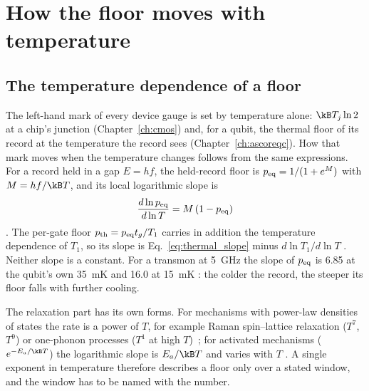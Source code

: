 \chapter{How the floor moves with temperature}\label{ch:thermaln}

\section{The temperature dependence of a floor}\label{sec:floorT}

The left-hand mark of every device gauge is set by temperature alone: $\kB T_j\ln2$ at a chip's junction (Chapter~\ref{ch:cmos}) and, for a
qubit, the thermal floor of its record at the temperature the record sees (Chapter~\ref{ch:ascoreqc}). How that mark moves when the
temperature changes follows from the same expressions. For a record held in a gap $E=hf$, the held-record floor is
$p_{\rm eq}=1/(1+e^{M})$ with $M=hf/\kB T$, and its local logarithmic slope is
\begin{equation}
 \frac{d\ln p_{\rm eq}}{d\ln T}=M\,(1-p_{\rm eq})
 \label{eq:thermal_slope}
\end{equation}
\derived. The per-gate floor $p_{\rm th}=p_{\rm eq}t_g/T_1$ carries in addition the temperature dependence of $T_1$, so its slope is
Eq.~\eqref{eq:thermal_slope} minus $d\ln T_1/d\ln T$ \derived. Neither slope is a constant. For a transmon at 5~GHz the slope of $p_{\rm eq}$
is 6.85 at the qubit's own 35~mK and 16.0 at 15~mK \calc: the colder the record, the steeper its floor falls with further cooling.

The relaxation part has its own forms. For mechanisms with power-law densities of states the rate is a power of $T$, for example Raman
spin--lattice relaxation ($T^7$, $T^9$) or one-phonon processes ($T^1$ at high $T$)~\cite{Abragam1970}; for activated mechanisms
($e^{-E_a/\kB T}$) the logarithmic slope is $E_a/\kB T$ and varies with $T$ \derived. A single exponent in temperature therefore describes a
floor only over a stated window, and the window has to be named with the number.


